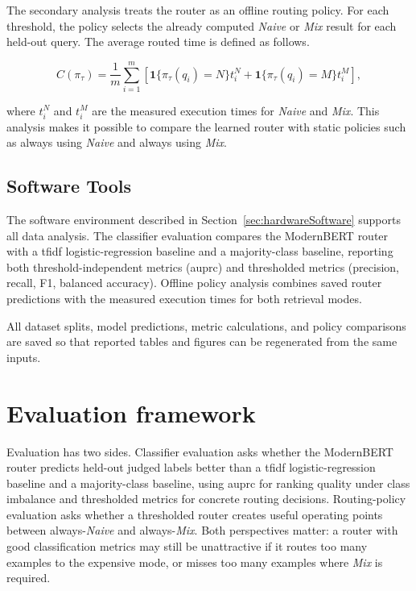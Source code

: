 \documentclass[english, bibtex]{kththesis}               %
\numberwithin{listing}{chapter}
\begin{document}
The secondary analysis treats the router as an offline routing policy. For each threshold, the policy selects the already computed \emph{Naive} or \emph{Mix} result for each held-out query. The average routed time is defined as follows.

\begin{equation}
\label{eq:averageRoutedTime}
C(\pi_\tau)=
\frac{1}{m}\sum_{i=1}^{m}
\left[
\mathbf{1}\{\pi_\tau(q_i)=N\}t_i^N+
\mathbf{1}\{\pi_\tau(q_i)=M\}t_i^M
\right],
\end{equation}

where \(t_i^N\) and \(t_i^M\) are the measured execution times for \emph{Naive} and \emph{Mix}. This analysis makes it possible to compare the learned router with static policies such as always using \emph{Naive} and always using \emph{Mix}.

\subsection{Software Tools}
\label{sec:softwareTools}

The software environment described in Section~\ref{sec:hardwareSoftware} supports all data analysis. The classifier evaluation compares the ModernBERT router with a \gls{tfidf} logistic-regression baseline and a majority-class baseline, reporting both threshold-independent metrics (\gls{auprc}) and thresholded metrics (precision, recall, F1, balanced accuracy). Offline policy analysis combines saved router predictions with the measured execution times for both retrieval modes.

All dataset splits, model predictions, metric calculations, and policy comparisons are saved so that reported tables and figures can be regenerated from the same inputs.


\section{Evaluation framework}
\label{sec:evaluationFramework}

Evaluation has two sides. Classifier evaluation asks whether the ModernBERT router predicts held-out judged labels better than a \gls{tfidf} logistic-regression baseline and a majority-class baseline, using \gls{auprc} for ranking quality under class imbalance and thresholded metrics for concrete routing decisions. Routing-policy evaluation asks whether a thresholded router creates useful operating points between always-\emph{Naive} and always-\emph{Mix}. Both perspectives matter: a router with good classification metrics may still be unattractive if it routes too many examples to the expensive mode, or misses too many examples where \emph{Mix} is required.
\end{document}
